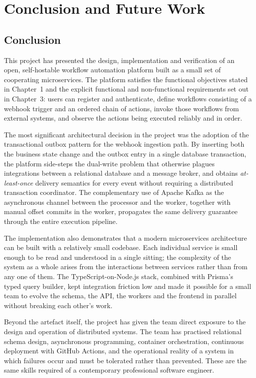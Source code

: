 \chapter{Conclusion and Future Work}

\section{Conclusion}

This project has presented the design, implementation and verification of an open, self-hostable workflow automation platform built as a small set of cooperating microservices. The platform satisfies the functional objectives stated in Chapter~1 and the explicit functional and non-functional requirements set out in Chapter~3: users can register and authenticate, define workflows consisting of a webhook trigger and an ordered chain of actions, invoke those workflows from external systems, and observe the actions being executed reliably and in order.

The most significant architectural decision in the project was the adoption of the transactional outbox pattern for the webhook ingestion path. By inserting both the business state change and the outbox entry in a single database transaction, the platform side-steps the dual-write problem that otherwise plagues integrations between a relational database and a message broker, and obtains \emph{at-least-once} delivery semantics for every event without requiring a distributed transaction coordinator. The complementary use of Apache Kafka as the asynchronous channel between the processor and the worker, together with manual offset commits in the worker, propagates the same delivery guarantee through the entire execution pipeline.

The implementation also demonstrates that a modern microservices architecture can be built with a relatively small codebase. Each individual service is small enough to be read and understood in a single sitting; the complexity of the system as a whole arises from the interactions between services rather than from any one of them. The TypeScript-on-Node.js stack, combined with Prisma's typed query builder, kept integration friction low and made it possible for a small team to evolve the schema, the API, the workers and the frontend in parallel without breaking each other's work.

Beyond the artefact itself, the project has given the team direct exposure to the design and operation of distributed systems. The team has practised relational schema design, asynchronous programming, container orchestration, continuous deployment with GitHub Actions, and the operational reality of a system in which failures occur and must be tolerated rather than prevented. These are the same skills required of a contemporary professional software engineer.

